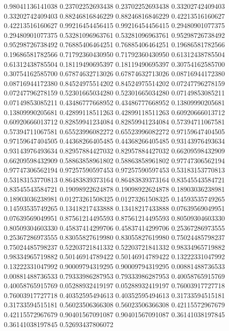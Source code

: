    0.98041136141038   0.23702252693438
   0.23702252693438   0.33202742409403
   0.33202742409403   0.88246816846229
   0.88246816846229   0.42213516160627
   0.42213516160627   0.99216454456415
   0.99216454456415   0.29480901077375
   0.29480901077375   0.53281096963761
   0.53281096963761   0.95298726738492
   0.95298726738492   0.76885406464251
   0.76885406464251   0.19686581782566
   0.19686581782566   0.71792360430950
   0.71792360430950   0.61312438785504
   0.61312438785504   0.18119490695397
   0.18119490695397   0.30754162585700
   0.30754162585700   0.67874632713026
   0.67874632713026   0.08716944172380
   0.08716944172380   0.84524975514202
   0.84524975514202   0.07247796278159
   0.07247796278159   0.52301665034280
   0.52301665034280   0.07149853085211
   0.07149853085211   0.43486777668952
   0.43486777668952   0.13809990205681
   0.13809990205681   0.42899118511263
   0.42899118511263   0.60920666013712
   0.60920666013712   0.82859941234084
   0.82859941234084   0.57394711067581
   0.57394711067581   0.65523996082272
   0.65523996082272   0.97159647404505
   0.97159647404505   0.44368266405485
   0.44368266405485   0.93143976493634
   0.93143976493634   0.82957884427032
   0.82957884427032   0.66209598432909
   0.66209598432909   0.58863858961802
   0.58863858961802   0.97747306562194
   0.97747306562194   0.97257590597453
   0.97257590597453   0.53183153770813
   0.53183153770813   0.86483839373164
   0.86483839373164   0.83545543584721
   0.83545543584721   0.19098922624878
   0.19098922624878   0.18903036238981
   0.18903036238981   0.01273261508325
   0.01273261508325   0.14593535749265
   0.14593535749265   0.13418217433888
   0.13418217433888   0.07639569049951
   0.07639569049951   0.87561214495593
   0.87561214495593   0.80509304603330
   0.80509304603330   0.45837414299706
   0.45837414299706   0.25367286973555
   0.25367286973555   0.83055827619980
   0.83055827619980   0.75024485798237
   0.75024485798237   0.52203721841332
   0.52203721841332   0.98334965719882
   0.98334965719882   0.50146914789422
   0.50146914789422   0.13222331047992
   0.13222331047992   0.90009794319295
   0.90009794319295   0.00881488736533
   0.00881488736533   0.79333986287953
   0.79333986287953   0.40058765915769
   0.40058765915769   0.05288932419197
   0.05288932419197   0.76003917727718
   0.76003917727718   0.40352595494613
   0.40352595494613   0.31733594515181
   0.31733594515181   0.56023506366308
   0.56023506366308   0.42115572967679
   0.42115572967679   0.90401567091087
   0.90401567091087   0.36141038197845
   0.36141038197845   0.52693437806072
